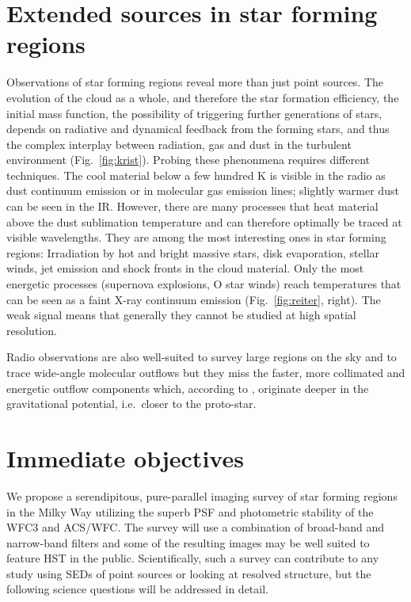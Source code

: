 \documentclass[12pt]{article}
\begin{document}
\section{Extended sources in star forming regions}
Observations of star forming regions reveal more than just point sources. The evolution of the
cloud as a whole, and therefore the star formation efficiency, the initial mass function, the possibility of triggering further generations of stars, depends on radiative and dynamical feedback from the forming stars, and thus the complex interplay between radiation, gas and dust in the turbulent environment (Fig.~\ref{fig:krist}). Probing these phenonmena requires different techniques. The
cool material below a few hundred K is visible in the radio as dust continuum
emission or in molecular gas emission lines; slightly warmer dust can be seen in
the IR. However, there are many processes that heat material above the dust
sublimation temperature and can therefore optimally be traced at visible wavelengths. 
They are among the most interesting ones in star forming regions:
Irradiation by hot and bright massive stars, disk evaporation, stellar winds,
jet emission and shock fronts in the cloud material. Only the most energetic
processes (supernova explosions, O star winds) reach temperatures that can be seen as a faint
X-ray continuum emission (Fig.~\ref{fig:reiter}, right). The weak signal means that generally they 
cannot be studied at high spatial resolution.

Radio observations are also well-suited to survey large regions on the sky and to
trace wide-angle molecular outflows \citep[e.g.][]{2003MNRAS.341..707C} but
they miss the faster, more collimated and energetic outflow components which, according to \citep{2003ApJ...590L.107A}, originate
deeper in the gravitational potential, i.e.\ closer to the proto-star.


\section{Immediate objectives}
We propose a serendipitous, pure-parallel imaging survey of star forming regions in the Milky Way utilizing the superb PSF and photometric stability of the WFC3 and ACS/WFC. The survey will use a combination of broad-band and narrow-band filters and some of the resulting images may be well suited to feature HST in the public.
Scientifically, such a survey can contribute to any study using SEDs of point sources or looking at resolved structure, but the following science questions will be addressed in detail.
\end{document}
